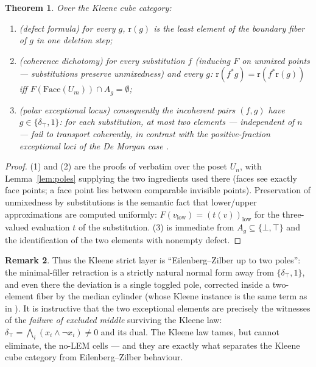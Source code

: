 \documentclass[11pt]{amsart}
\newtheorem{thm}{Theorem}[section]
\theoremstyle{definition}
\newtheorem{rem}[thm]{Remark}
\newcommand{\uc}{U}
\newcommand{\Face}{\mathrm{Face}}
\newcommand{\rmin}{\mathrm{r}}
\begin{document}
\begin{thm}
  \label{thm:strict}
  Over the Kleene cube category:
  \begin{enumerate}
  \item (\emph{defect formula}) for every $g$, $\rmin(g)$ is the
    least element of the boundary fiber of $g$ in one deletion
    step;
  \item (\emph{coherence dichotomy}) for every substitution $f$
    (inducing $F$ on unmixed points --- substitutions preserve
    unmixedness) and every $g$:
    $\rmin(f^{*}g) = \rmin(f^{*}\rmin(g))$ iff
    $F(\Face(\uc_m)) \cap A_g = \emptyset$;
  \item (\emph{polar exceptional locus}) consequently the
    incoherent pairs $(f, g)$ have
    $g \in \{\delta_{\top}, 1\}$: for each substitution, at most
    two elements --- independent of $n$ --- fail to transport
    coherently, in contrast with the positive-fraction exceptional
    loci of the De Morgan case \cite{StrictDM}.
  \end{enumerate}
\end{thm}

\begin{proof}
  (1) and (2) are the proofs of \cite[Thm.~4.1, Thm.~5.2]{StrictDM}
  verbatim over the poset $\uc_n$, with
  Lemma~\ref{lem:poles} supplying the two ingredients used there
  (faces see exactly face points; a face point lies between
  comparable invisible points).  Preservation of unmixedness by
  substitutions is the semantic fact that lower/upper
  approximations are computed uniformly:
  $F(v_{\mathrm{low}}) = (t(v))_{\mathrm{low}}$ for the
  three-valued evaluation $t$ of the substitution.  (3) is
  immediate from $A_g \subseteq \{\bot,\top\}$ and the
  identification of the two elements with nonempty defect.
\end{proof}

\begin{rem}
  Thus the Kleene strict layer is ``Eilenberg--Zilber up to two
  poles'': the minimal-filler retraction is a strictly natural
  normal form away from $\{\delta_\top, 1\}$, and even there the
  deviation is a single toggled pole, corrected inside a two-element
  fiber by the median cylinder (whose Kleene instance is the same
  term as in \cite{DMFibers}).  It is instructive that the two
  exceptional elements are precisely the witnesses of the
  \emph{failure of excluded middle} surviving the Kleene law:
  $\delta_\top = \bigwedge_i (x_i \wedge \neg x_i) \neq 0$ and its
  dual.  The Kleene law tames, but cannot eliminate, the no-LEM
  cells --- and they are exactly what separates the Kleene cube
  category from Eilenberg--Zilber behaviour.
\end{rem}
\end{document}
